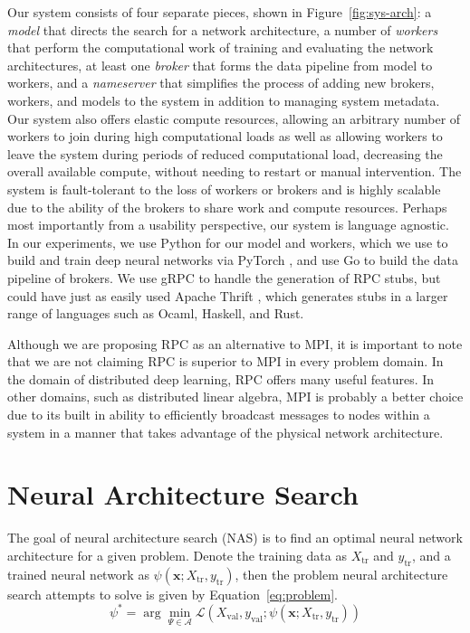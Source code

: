 \documentclass[conference]{IEEEtran}
\begin{document}
Our system consists of four separate pieces, shown in Figure~\ref{fig:sys-arch}:
a \emph{model} that directs the
search for a network architecture, a number of \emph{workers} that perform the
computational work of training and evaluating the network architectures, at
least one \emph{broker} that forms the data pipeline from model to workers, and
a \emph{nameserver} that simplifies the process of adding new brokers, workers,
and models to the system in addition to managing system metadata. Our system
also offers elastic compute resources, allowing an arbitrary number of workers
to join during high computational loads as well as allowing workers to leave the
system during periods of reduced computational load, decreasing the overall
available compute, without needing to restart or manual intervention.  The
system is fault-tolerant to the loss of workers or brokers and is highly
scalable due to the ability of the brokers to share work and compute
resources. Perhaps most importantly from a usability perspective, our system is
language agnostic. In our experiments, we use Python for our model and workers,
which we use to build and train deep neural networks via PyTorch
\cite{paszke2017automatic}, and use Go to build the data pipeline of brokers. We
use gRPC \cite{Wang:1993:GCC:155870.155881} to handle the generation of RPC
stubs, but could have just as easily used Apache Thrift \cite{Slee2007}, which
generates stubs in a larger range of languages such as Ocaml, Haskell, and Rust.

Although we are proposing RPC as an alternative to MPI, it is important to note
that we are not claiming RPC is superior to MPI in every problem domain. In the
domain of distributed deep learning, RPC offers many useful features. In other
domains, such as distributed linear algebra, MPI is probably a better choice due
to its built in ability to efficiently broadcast messages to nodes within a
system in a manner that takes advantage of the physical network architecture.

\section{Neural Architecture Search}
The goal of neural architecture search (NAS) is to find an optimal neural
network architecture for a given problem. Denote the training data as
$X_{\text{tr}}$ and $y_{\text{tr}}$, and a trained neural network as
$\psi(\mathbf{x}; X_{\text{tr}}, y_{\text{tr}})$, then the problem
neural architecture search attempts to solve is given by
Equation~\eqref{eq:problem}.
\begin{equation}\label{eq:problem}
\psi^* = \arg\min_{\Psi \in \mathcal{A}} \mathcal{L}(X_{\text{val}}, y_{\text{val}}; \psi(\mathbf{x}; X_{\text{tr}}, y_{\text{tr}}))
\end{equation}
\end{document}

